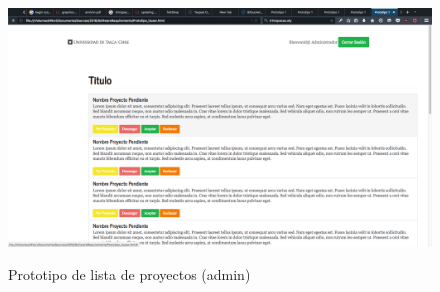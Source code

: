 \begin{figure}[!ht]
\includegraphics[width=\textwidth]{images/proto/4}
\label{FIG:PROTO_4}
\caption{Prototipo de lista de proyectos (admin)}
\end{figure}